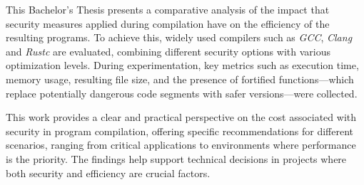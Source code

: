 This Bachelor's Thesis presents a comparative analysis of the impact
that security measures applied during compilation have on the efficiency
of the resulting programs. To achieve this, widely used compilers such
as \emph{GCC}, \emph{Clang} and \emph{Rustc} are evaluated, combining different
security options with various optimization levels. During
experimentation, key metrics such as execution time, memory usage,
resulting file size, and the presence of fortified functions---which
replace potentially dangerous code segments with safer versions---were
collected.

This work provides a clear and practical perspective on the cost
associated with security in program compilation, offering specific
recommendations for different scenarios, ranging from critical
applications to environments where performance is the priority. The
findings help support technical decisions in projects where both
security and efficiency are crucial factors.

\clearpage